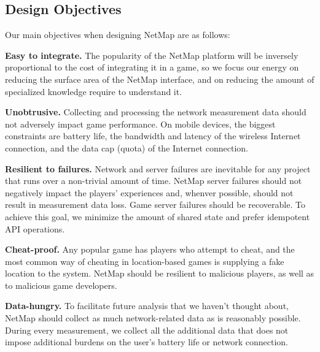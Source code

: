 \subsection{Design Objectives}

Our main objectives when designing NetMap are as follows:

\textbf{Easy to integrate.} The popularity of the NetMap platform will be
inversely proportional to the cost of integrating it in a game, so we focus
our energy on reducing the surface area of the NetMap interface, and on
reducing the amount of specialized knowledge require to understand it.

\textbf{Unobtrusive.} Collecting and processing the network measurement data
should not adversely impact game performance. On mobile devices, the biggest
constraints are battery life, the bandwidth and latency of the wireless
Internet connection, and the data cap (quota) of the Internet connection.

\textbf{Resilient to failures.} Network and server failures are inevitable for
any project that runs over a non-trivial amount of time. NetMap server failures
should not negatively impact the players' experiences and, whenver possible,
should not result in measurement data loss. Game server failures should be
recoverable. To achieve this goal, we minimize the amount of shared state and
prefer idempotent API operations.

\textbf{Cheat-proof.} Any popular game has players who attempt to cheat, and
the most common way of cheating in location-based games is supplying a fake
location to the system. NetMap should be resilient to malicious players, as
well as to malicious game developers.

\textbf{Data-hungry.} To facilitate future analysis that we haven't thought
about, NetMap should collect as much network-related data as is reasonably
possible. During every measurement, we collect all the additional data that
does not impose additional burdens on the user's battery life or network
connection.
